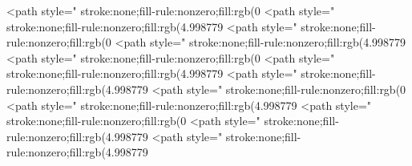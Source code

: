 <path style=" stroke:none;fill-rule:nonzero;fill:rgb(0%
<path style=" stroke:none;fill-rule:nonzero;fill:rgb(4.998779%
<path style=" stroke:none;fill-rule:nonzero;fill:rgb(0%
<path style=" stroke:none;fill-rule:nonzero;fill:rgb(4.998779%
<path style=" stroke:none;fill-rule:nonzero;fill:rgb(0%
<path style=" stroke:none;fill-rule:nonzero;fill:rgb(4.998779%
<path style=" stroke:none;fill-rule:nonzero;fill:rgb(4.998779%
<path style=" stroke:none;fill-rule:nonzero;fill:rgb(0%
<path style=" stroke:none;fill-rule:nonzero;fill:rgb(4.998779%
<path style=" stroke:none;fill-rule:nonzero;fill:rgb(0%
<path style=" stroke:none;fill-rule:nonzero;fill:rgb(4.998779%
<path style=" stroke:none;fill-rule:nonzero;fill:rgb(4.998779%
